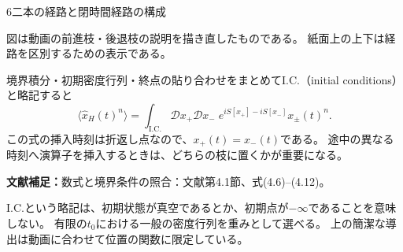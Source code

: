 \documentclass[a4paper,11pt]{ltjsarticle}
\numberwithin{equation}{section}
\newcommand{\av}[1]{\langle #1\rangle}
\newcommand{\supplement}[1]{\par\medskip\noindent\textcolor{notered}{\textbf{文献補足：}}#1\par\smallskip}
\begin{document}
\begin{lecturesection}{6}{二本の経路と閉時間経路の構成}
\begin{center}
\end{center}
図は動画の前進枝・後退枝の説明を描き直したものである。
紙面上の上下は経路を区別するための表示である。

境界積分・初期密度行列・終点の貼り合わせをまとめてI.C.（initial conditions）と略記すると
\begin{equation}
 \av{\hat x_H(t)^n}
 =\int_{\mathrm{I.C.}}\mathcal D x_+\mathcal D x_-\;
   e^{iS[x_+]-iS[x_-]}x_\pm(t)^n.
\end{equation}
この式の挿入時刻は折返し点なので、$x_+(t)=x_-(t)$である。
途中の異なる時刻へ演算子を挿入するときは、どちらの枝に置くかが重要になる。

\supplement{数式と境界条件の照合：文献\cite{Pajer:2026fuo}第4.1節、式(4.6)--(4.12)。}
I.C.という略記は、初期状態が真空であるとか、初期点が$-\infty$であることを意味しない。
有限の$t_0$における一般の密度行列を重みとして選べる。
上の簡潔な導出は動画に合わせて位置の関数に限定している。
\end{lecturesection}
\end{document}
